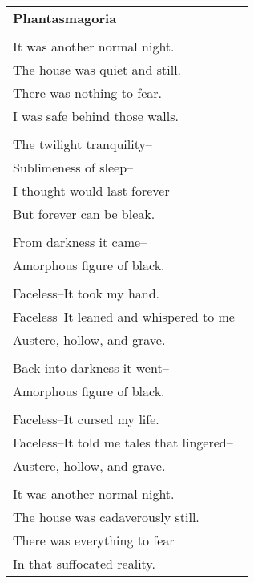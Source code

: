 \documentclass{article}
\begin{document}
\newcommand{\h}{\hspace{3ex}}
\newcommand{\hoar}{%
\begin{center}
\line(1,0){350}
\end{center}
}

\begin{center}
\begin{tabular}{l}
\textbf{Phantasmagoria} \\
\\
It was another normal night. \\
The house was quiet and still. \\
There was nothing to fear. \\
I was safe behind those walls. \\
\\
The twilight tranquility-- \\
Sublimeness of sleep-- \\
I thought would last forever-- \\
But forever can be bleak. \\
\\
From darkness it came-- \\
Amorphous figure of black. \\
\\
Faceless--It took my hand. \\
Faceless--It leaned and whispered to me-- \\
Austere, hollow, and grave. \\
\\
Back into darkness it went-- \\
Amorphous figure of black. \\
\\
Faceless--It cursed my life. \\
Faceless--It told me tales that lingered-- \\
Austere, hollow, and grave. \\
\\
It was another normal night. \\
The house was cadaverously still. \\
There was everything to fear \\
In that suffocated reality. \\
\end{tabular}
\end{center}
\end{document}
